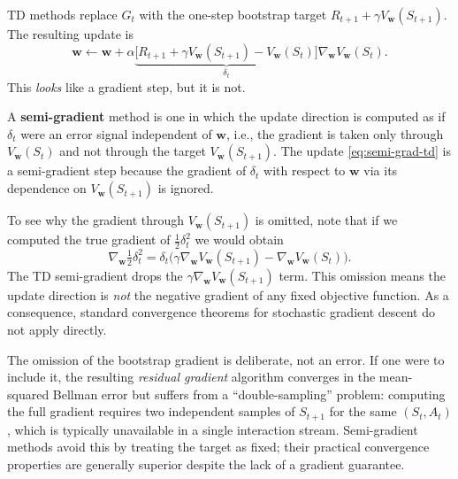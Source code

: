 TD methods replace $G_t$ with the one-step bootstrap target $R_{t+1} + \gamma V_\mathbf{w}(S_{t+1})$.
The resulting update is
\begin{equation}
\label{eq:semi-grad-td}
\mathbf{w} \leftarrow \mathbf{w} + \alpha\underbrace{\bigl[R_{t+1} + \gamma V_\mathbf{w}(S_{t+1}) - V_\mathbf{w}(S_t)\bigr]}_{\delta_t}\nabla_\mathbf{w} V_\mathbf{w}(S_t).
\end{equation}
This \emph{looks} like a gradient step, but it is not.

\begin{definition}
\label{def:semi-gradient}
A \textbf{semi-gradient} method is one in which the update direction is computed as if $\delta_t$
were an error signal independent of $\mathbf{w}$, i.e., the gradient is taken only through
$V_\mathbf{w}(S_t)$ and not through the target $V_\mathbf{w}(S_{t+1})$.  The update
\eqref{eq:semi-grad-td} is a semi-gradient step because the gradient of $\delta_t$ with respect
to $\mathbf{w}$ via its dependence on $V_\mathbf{w}(S_{t+1})$ is ignored.
\end{definition}

To see why the gradient through $V_\mathbf{w}(S_{t+1})$ is omitted, note that if we computed
the true gradient of $\frac{1}{2}\delta_t^2$ we would obtain
\[
\nabla_\mathbf{w}\tfrac{1}{2}\delta_t^2
= \delta_t\bigl(\gamma\nabla_\mathbf{w}V_\mathbf{w}(S_{t+1}) - \nabla_\mathbf{w}V_\mathbf{w}(S_t)\bigr).
\]
The TD semi-gradient drops the $\gamma\nabla_\mathbf{w}V_\mathbf{w}(S_{t+1})$ term.  This
omission means the update direction is \emph{not} the negative gradient of any fixed objective
function.  As a consequence, standard convergence theorems for stochastic gradient descent do not
apply directly.

\begin{remark}
\label{rem:semi-grad-motivation}
The omission of the bootstrap gradient is deliberate, not an error.  If one were to include it,
the resulting \emph{residual gradient} algorithm converges in the mean-squared Bellman error but
suffers from a ``double-sampling'' problem: computing the full gradient requires two independent
samples of $S_{t+1}$ for the same $(S_t, A_t)$, which is typically unavailable in a single
interaction stream.  Semi-gradient methods avoid this by treating the target as fixed; their
practical convergence properties are generally superior despite the lack of a gradient guarantee.
\end{remark}

